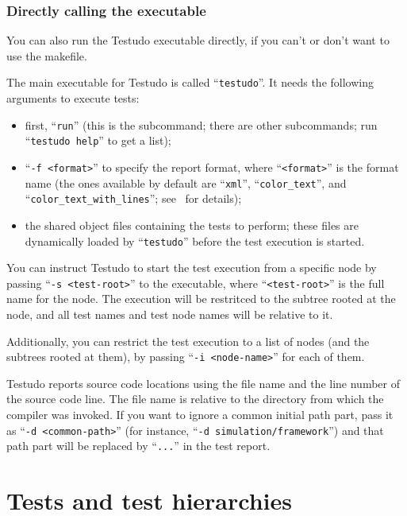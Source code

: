 \documentclass[twoside, a4paper, article]{memoir}
\begin{document}
\subsection{Directly calling the executable}
\label{sec:directly-calling-executable}

You can also run the Testudo executable directly, if you can't or don't want to
use the makefile.

The main executable for Testudo is called ``\texttt{testudo}''.  It needs the
following arguments to execute tests:
\begin{itemize}
\item first, ``\texttt{run}'' (this is the subcommand; there are other
  subcommands; run ``\texttt{testudo help}'' to get a list);
\item ``\texttt{-f <format>}'' to specify the report format, where
  ``\texttt{<format>}'' is the format name (the ones available by default are
  ``\texttt{xml}'', ``\texttt{color\_text}'', and
  ``\texttt{color\_text\_with\_lines}''; see~ for
  details);
\item the shared object files containing the tests to perform; these files are
  dynamically loaded by ``\texttt{testudo}'' before the test execution is
  started.
\end{itemize}

You can instruct Testudo to start the test execution from a specific node by
passing ``\texttt{-s <test-root>}'' to the executable, where
``\texttt{<test-root>}'' is the full name for the node.  The execution will be
restritced to the subtree rooted at the node, and all test names and test node
names will be relative to it.

Additionally, you can restrict the test execution to a list of nodes (and the
subtrees rooted at them), by passing ``\texttt{-i <node-name>}'' for each of
them.

Testudo reports source code locations using the file name and the line number
of the source code line.  The file name is relative to the directory from which
the compiler was invoked.  If you want to ignore a common initial path part,
pass it as ``\texttt{-d <common-path>}'' (for instance, ``\texttt{-d
  simulation/framework}'') and that path part will be replaced by
``\texttt{...}''  in the test report.


\chapter{Tests and test hierarchies}
\label{cha:tests-test-hierarchies}
\end{document}
